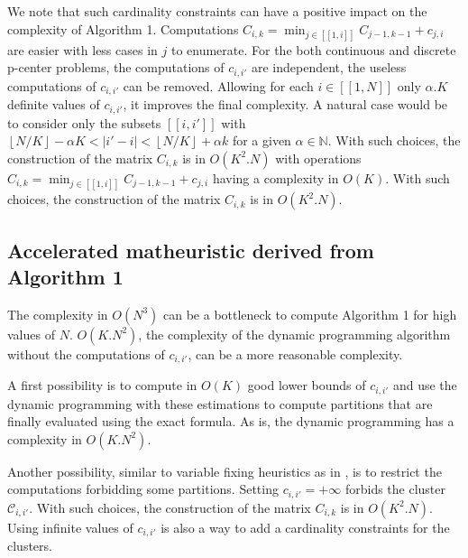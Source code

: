 \documentclass{meta}
\def\NN{{\mathbb{N}}}
\def\CC{{\mathcal{C}}}
\begin{document}
We note that such cardinality constraints can have a positive impact on the complexity of Algorithm 1.
Computations $C_{i,k} = \min_{j \in [\![1,i]\!]} C_{j-1,k-1} + c_{j,i}$ are easier with less cases in $j$ to enumerate.
For the both continuous and discrete p-center problems, the computations of $c_{i,i'}$ are independent, the useless computations of $c_{i,i'}$ can be removed.
Allowing for each $i \in [\![1,N]\!]$ only $\alpha .K$ definite values of $c_{i,i'}$, it improves the final complexity.
 A natural case would be to consider only the subsets $ [\![i,i']\!]$ 
 with $\left \lfloor N / K \right\rfloor- \alpha K <|i'-i|< \left \lfloor N / K \right \rfloor+ \alpha k$ for a given $\alpha\in\NN$.
With such choices, the construction of the matrix $C_{i,k}$ is in $O(K^2.N)$
with operations  $C_{i,k} = \min_{j \in [\![1,i]\!]} C_{j-1,k-1} + c_{j,i}$ having a complexity in $O(K)$.
With such choices, the construction of the matrix $C_{i,k}$ is in $O(K^2.N)$.

\subsection{Accelerated matheuristic derived from Algorithm 1}
The complexity in $O(N^3)$ can be a bottleneck to compute Algorithm 1 for high values of $N$.
$O(K.N^2)$, the complexity of the dynamic programming algorithm without the computations of $c_{i,i'}$, can be a more reasonable complexity.

A first possibility is to compute in $O(K)$ good lower bounds of $c_{i,i'}$ and use the dynamic programming
with these estimations to compute partitions that are finally evaluated using the exact formula.
As is, the dynamic programming has a complexity in $O(K.N^2)$.

Another possibility, similar to variable fixing heuristics as in \cite{dupin2018parallel},
is to restrict the computations forbidding some partitions.
Setting $c_{i,i'}= + \infty$ forbids the cluster $\CC_{i,i'}$.
With such choices, the construction of the matrix $C_{i,k}$ is in $O(K^2.N)$.
Using infinite values of $c_{i,i'}$ is also a way to add a cardinality constraints for the clusters.
\end{document}

